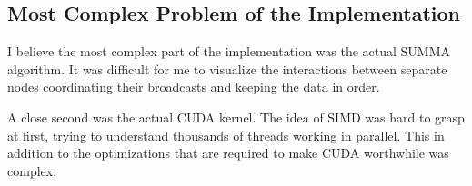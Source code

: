 \documentclass[11pt, twocolumn]{article}
\begin{document}
\subsection{Most Complex Problem of the Implementation}
I believe the most complex part of the implementation was the actual SUMMA algorithm. It was difficult for me to visualize the interactions between separate nodes coordinating their broadcasts and keeping the data in order. 

A close second was the actual CUDA kernel. The idea of SIMD was hard to grasp at first, trying to understand thousands of threads working in parallel. This in addition to the optimizations that are required to make CUDA worthwhile was complex.




\end{document}
